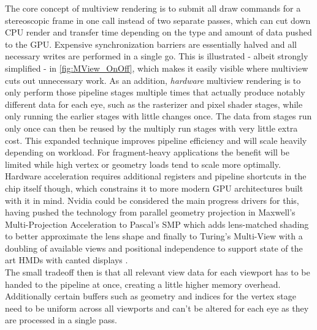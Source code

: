The core concept of multiview rendering is to submit all draw commands for a stereoscopic frame in one call instead of two separate passes, which can cut down CPU render and transfer time depending on the type and amount of data pushed to the GPU. Expensive synchronization barriers are essentially halved and all necessary writes are performed in a single go. This is illustrated - albeit strongly simplified - in \autoref{fig:MView_OnOff}, which makes it easily visible where multiview cuts out unnecessary work. 
As an addition, \textit{hardware} multiview rendering is to only perform those pipeline stages multiple times that actually produce notably different data for each eye, such as the rasterizer and pixel shader stages, while only running the earlier stages with little changes once. The data from stages run only once can then be reused by the multiply run stages with very little extra cost. This expanded technique improves pipeline efficiency and will scale heavily depending on workload. For fragment-heavy applications the benefit will be limited while high vertex or geometry loads tend to scale more optimally. Hardware acceleration requires additional registers and pipeline shortcuts in the chip itself though, which constrains it to more modern GPU architectures built with it in mind. Nvidia could be considered the main progress drivers for this, having pushed the technology from parallel geometry projection in Maxwell's Multi-Projection Acceleration to Pascal's SMP which adds lens-matched shading to better approximate the lens shape and finally to Turing's Multi-View with a doubling of available views and positional independence to support state of the art HMDs with canted displays \cite{Bhonde.2018}. \\
The small tradeoff then is that all relevant view data for each viewport has to be handed to the pipeline at once, creating a little higher memory overhead. Additionally certain buffers such as geometry and indices for the vertex stage need to be uniform across all viewports and can't be altered for each eye as they are processed in a single pass. 

